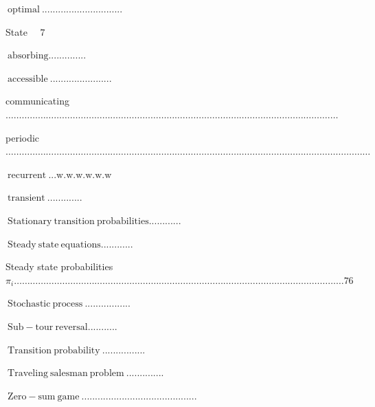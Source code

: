 \documentclass[10pt]{article}
\begin{document}
$\mathrm{~ o p t i m a l ~ . . . . . . . . . . . . . . . . . . . . . . . . . . . . . .}$

State $\quad 7$

$\mathrm{~ a b s o r b i n g . . . . . . . . . . . . . .}$

$\mathrm{~ a c c e s s i b l e ~ . . . . . . . . . . . . . . . . . . . . . . .}$

communicating $\ldots \ldots \ldots \ldots \ldots \ldots \ldots \ldots \ldots \ldots \ldots \ldots \ldots \ldots \ldots \ldots \ldots \ldots \ldots \ldots \ldots \ldots \ldots \ldots \ldots \ldots \ldots \ldots \ldots \ldots \ldots \ldots \ldots \ldots \ldots \ldots \ldots \ldots \ldots \ldots . \ldots$

periodic $\ldots \ldots \ldots \ldots \ldots \ldots \ldots \ldots \ldots \ldots \ldots \ldots \ldots \ldots \ldots \ldots \ldots \ldots \ldots \ldots \ldots \ldots \ldots \ldots \ldots \ldots \ldots \ldots \ldots \ldots \ldots \ldots \ldots \ldots \ldots \ldots \ldots \ldots \ldots \ldots \ldots \ldots \ldots \ldots . \ldots$

$\mathrm{~ r e c u r r e n t ~ . . . w . w . w . w . w . w}$

$\mathrm{~ t r a n s i e n t ~ . . . . . . . . . . . . .}$

$\mathrm{~ S t a t i o n a r y ~ t r a n s i t i o n ~ p r o b a b i l i t i e s . . . . . . . . . . . .}$

$\mathrm{~ S t e a d y ~ s t a t e ~ e q u a t i o n s . . . . . . . . . . . .}$

Steady state probabilities $\pi_{i} \ldots \ldots \ldots \ldots \ldots \ldots \ldots \ldots \ldots \ldots \ldots \ldots \ldots \ldots \ldots \ldots \ldots \ldots \ldots \ldots \ldots \ldots \ldots \ldots \ldots \ldots \ldots \ldots \ldots \ldots \ldots \ldots \ldots \ldots \ldots \ldots \ldots \ldots \ldots \ldots \ldots 76$

$\mathrm{~ S t o c h a s t i c ~ p r o c e s s ~ . . . . . . . . . . . . . . . . .}$

$\mathrm{~ S u b - t o u r ~ r e v e r s a l . . . . . . . . . . .}$

$\mathrm{~ T r a n s i t i o n ~ p r o b a b i l i t y ~ . . . . . . . . . . . . . . . .}$

$\mathrm{~ T r a v e l i n g ~ s a l e s m a n ~ p r o b l e m ~ . . . . . . . . . . . . . .}$

$\mathrm{~ Z e r o - s u m ~ g a m e ~ . . . . . . . . . . . . . . . . . . . . . . . . . . . . . . . . . . . . . . . . . . .}$
\end{document}
